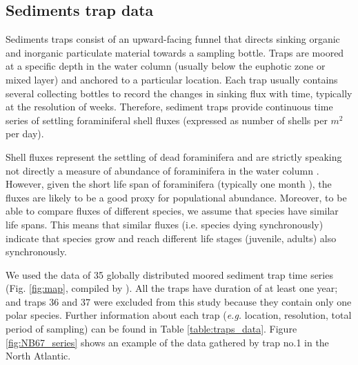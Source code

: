 



\subsection{Sediments trap data}

Sediments traps consist of an upward-facing funnel that directs sinking organic and inorganic particulate material towards a sampling bottle. 
Traps are moored at a specific depth in the water column (usually below the euphotic zone or mixed layer) and anchored to a particular location. %
Each trap usually contains several collecting bottles to record the changes in sinking flux with time, typically at the resolution of weeks. %
Therefore, sediment traps provide continuous time series of settling foraminiferal shell fluxes (expressed as number of shells per $m^2$ per day). 

Shell fluxes represent the settling of dead foraminifera and are strictly speaking not directly a measure of abundance of foraminifera in the water column \cite{jonkers2015global}. However, given the short life span of foraminifera (typically one month \citep{hemleben1989modern}), the fluxes are likely to be a good proxy for populational abundance. Moreover, to be able to compare fluxes of different species, we assume that species have similar life spans. This means that similar fluxes (i.e. species dying synchronously) indicate that species grow and reach different life stages (juvenile, adults) also synchronously.


We used the data of 35 globally distributed moored sediment trap time series (Fig. \ref{fig:map}, compiled by \citealt{jonkers2015global}). All the traps have duration of at least one year; and traps 36 and 37 were excluded from this study because they contain only one polar species. Further information about each trap (\textit{e.g.} location, resolution, total period of sampling) can be found in Table \ref{table:traps_data}. Figure \ref{fig:NB67_series} shows an example of the data gathered by trap no.1 in the North Atlantic. 

